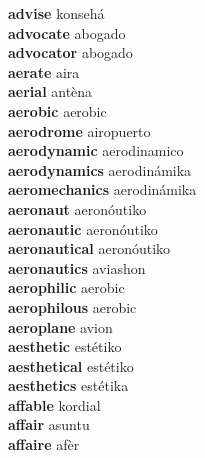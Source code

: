 \textbf{advise } konsehá \\
\textbf{advocate } abogado \\
\textbf{advocator } abogado \\
\textbf{aerate } aira \\
\textbf{aerial } antèna \\
\textbf{aerobic } aerobic \\
\textbf{aerodrome } airopuerto \\
\textbf{aerodynamic } aerodinamico \\
\textbf{aerodynamics } aerodinámika \\
\textbf{aeromechanics } aerodinámika \\
\textbf{aeronaut } aeronóutiko \\
\textbf{aeronautic } aeronóutiko \\
\textbf{aeronautical } aeronóutiko \\
\textbf{aeronautics } aviashon \\
\textbf{aerophilic } aerobic \\
\textbf{aerophilous } aerobic \\
\textbf{aeroplane } avion \\
\textbf{aesthetic } estétiko \\
\textbf{aesthetical } estétiko \\
\textbf{aesthetics } estétika \\
\textbf{affable } kordial \\
\textbf{affair } asuntu \\
\textbf{affaire } afèr \\
